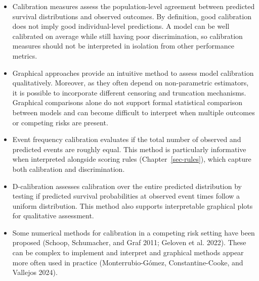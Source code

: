 \documentclass[
  letterpaper,
  krantz2]{style/krantz}
\providecommand{\tightlist}{%
  \setlength{\itemsep}{0pt}\setlength{\parskip}{0pt}}
\begin{document}
\begin{tcolorbox}[enhanced jigsaw, toprule=.15mm, bottomtitle=1mm, opacityback=0, breakable, leftrule=.75mm, title={Key takeaways}, toptitle=1mm, bottomrule=.15mm, colback=white, colframe=quarto-callout-warning-color-frame, titlerule=0mm, opacitybacktitle=0.6, coltitle=black, rightrule=.15mm, left=2mm, colbacktitle=quarto-callout-warning-color!10!white, arc=.35mm]

\begin{itemize}
\tightlist
\item
  Calibration measures assess the population-level agreement between
  predicted survival distributions and observed outcomes. By definition,
  good calibration does not imply good individual-level predictions. A
  model can be well calibrated on average while still having poor
  discrimination, so calibration measures should not be interpreted in
  isolation from other performance metrics.
\item
  Graphical approaches provide an intuitive method to assess model
  calibration qualitatively. Moreover, as they often depend on
  non-parametric estimators, it is possible to incorporate different
  censoring and truncation mechanisms. Graphical comparisons alone do
  not support formal statistical comparison between models and can
  become difficult to interpret when multiple outcomes or competing
  risks are present.
\item
  Event frequency calibration evaluates if the total number of observed
  and predicted events are roughly equal. This method is particularly
  informative when interpreted alongside scoring rules
  (Chapter~\ref{sec-rules}), which capture both calibration and
  discrimination.
\item
  D-calibration assesses calibration over the entire predicted
  distribution by testing if predicted survival probabilities at
  observed event times follow a uniform distribution. This method also
  supports interpretable graphical plots for qualitative assessment.
\item
  Some numerical methods for calibration in a competing risk setting
  have been proposed (Schoop, Schumacher, and Graf 2011; Geloven et al.
  2022). These can be complex to implement and interpret and graphical
  methods appear more often used in practice (Monterrubio-Gómez,
  Constantine-Cooke, and Vallejos 2024).
\end{itemize}

\end{tcolorbox}
\end{document}
